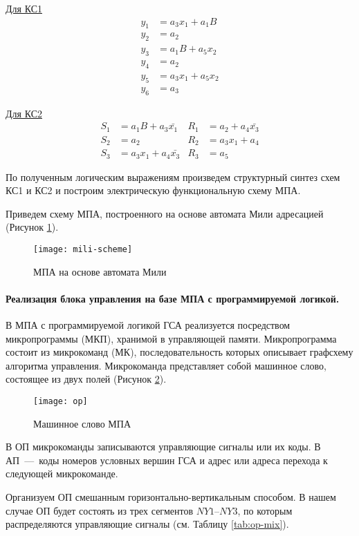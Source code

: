 \documentclass[a4paper,14pt]{extarticle}
\begin{document}
\underline{Для КС1}
\begin{align*}
	y_1 &= a_3x_1+a_1B \\
	y_2 & =a_2\\
	y_3 & =a_1B+ a_5x_2\\
	y_4 &=a_2\\
	y_5 & =a_3x_1+a_5x_2\\
	y_6 & = a_3
\end{align*}

\underline{Для КС2}
\begin{align*}
	S_1 &=a_1B+a_3\bar{x_1} &R_1& =a_2+a_4\bar{x_3} \\
	S_2 & =a_2 	& R_2 & = a_3x_1+a_4\\
	S_3 & = a_3x_1+a_4\bar{x_3} & R_3 & = a_5
\end{align*}
	
	По полученным логическим выражениям произведем структурный синтез схем КС1 и КС2 и построим электрическую функциональную схему МПА.
	
	
	Приведем схему МПА, построенного на основе автомата Мили адресацией (Рисунок \ref{fig:mili-scheme}).
	\begin{figure}[h!]
		\centering
		\texttt{[image: mili-scheme]}
		\caption{МПА на основе автомата Мили}
		\label{fig:mili-scheme}
	\end{figure}
	
	
	\newpage
	\paragraph{Реализация блока управления на базе МПА с программируемой логикой.}
	В МПА с программируемой логикой ГСА реализуется посредством микропрограммы (МКП), хранимой в управляющей памяти. Микропрограмма состоит из микрокоманд (МК), последовательность которых описывает графсхему алгоритма управления. Микрокоманда представляет собой машинное
	слово, состоящее из двух полей (Рисунок \ref{fig:op}). 
	
	\begin{figure}[h!]
		\centering
		\texttt{[image: op]}
		\caption{Машинное слово МПА	}
		\label{fig:op}
	\end{figure}

В ОП микрокоманды записываются управляющие сигналы или их коды. В АП~---~коды номеров условных вершин
ГСА и адрес или адреса перехода к следующей микрокоманде.

Организуем ОП смешанным горизонтально-вертикальным способом. В нашем случае ОП будет состоять из трех сегментов $NY1 – NY3$, по которым распределяются управляющие сигналы (см. Таблицу \ref{tab:op-mix}).
\end{document}
